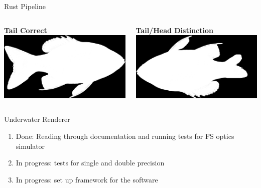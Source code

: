 \begin{frame}{Rust Pipeline}
    \begin{columns}[c]
          \centering
          \textbf{Tail Correct}\\[1ex]
          \includegraphics[height=0.48\textheight,keepaspectratio]{./images/picture1.png}
    
          \centering
          \textbf{Tail/Head Distinction}\\[1ex]
          \includegraphics[height=0.48\textheight,keepaspectratio]{./images/picture2.png}
    \end{columns}
\end{frame}

\begin{frame}{Underwater Renderer}
    \begin{enumerate}
	    \item Done: Reading through documentation and running tests for FS optics simulator
	    \item In progress: tests for single and double precision
	    \item In progress: set up framework for the software
    \end{enumerate}
\end{frame}

